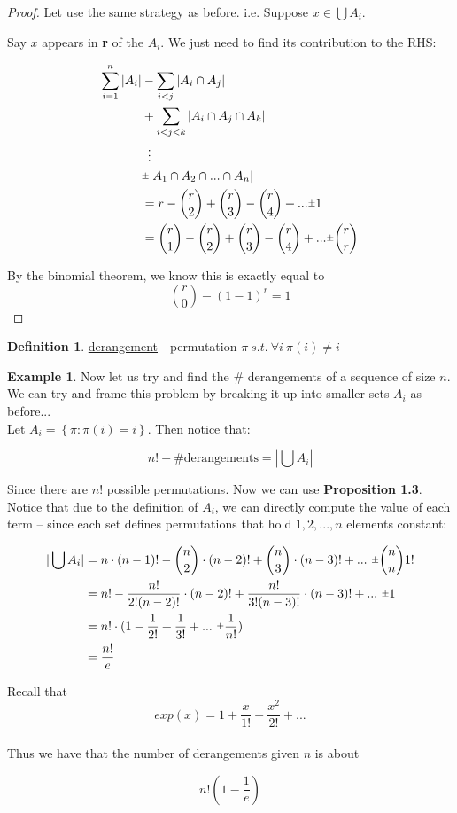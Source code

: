 \documentclass[psamsfonts, 12pt]{amsart}
\theoremstyle{definition}
\newtheorem{defn}[thm]{Definition}
\newtheorem{exmp}[thm]{Example}
\theoremstyle{remark}
\newcommand{\rpm}{\sbox0{$1$}\sbox2{$\scriptstyle\pm$}
  \raise\dimexpr(\ht0-\ht2)/2\relax\box2 }
\begin{document}
\begin{proof} Let use the same strategy as before. i.e. Suppose $x\in \bigcup A_i$.

Say $x$ appears in \textbf{r} of the $A_i$. We just need to find its contribution to the RHS:

\begin{align*}
\sum_{i=1}^n|A_i| &- \sum_{i<j}|A_i \cap A_j |\\
&+\sum_{i<j<k}|A_i \cap A_j \cap A_k |\\
&\ \vdots\\
&\rpm |A_1 \cap A_2 \cap ... \cap A_n | \\
&= r - {r\choose2} + {r\choose3} - {r\choose4} + ... \rpm 1\\
&= {r\choose1} - {r\choose2} + {r\choose3} - {r\choose4} + ... \rpm {r\choose r}
\end{align*}

By the binomial theorem, we know this is exactly equal to
\[
{r\choose0} - (1-1)^r = 1
\]

\end{proof}

\begin{defn}
\underline{derangement} - permutation $\pi\ s.t.\ \forall i\ \pi(i)\neq i$
\end{defn}

\begin{exmp}
Now let us try and find the \# derangements of a sequence of size $n$.
\\

We can try and frame this problem by breaking it up into smaller sets $A_i$ as before...
\\

Let $A_i = \left\lbrace \pi : \pi(i) = i \right\rbrace$. Then notice that:

\[
n! - \text{\# derangements} = |\bigcup A_i|
\]

Since there are $n!$ possible permutations. Now we can use \textbf{Proposition 1.3}. Notice that due to the definition of $A_i$, we can directly compute the value of each term -- since each set defines permutations that hold $1,2,...,n$ elements constant:

\begin{align*}
|\bigcup A_i| &= n \cdot (n-1)! - {n\choose2}\cdot(n-2)! + {n\choose3}\cdot(n-3)! + ...\ \rpm {n\choose n}1!\\
&= n! - \frac{n!}{2!(n-2)!}\cdot(n-2)! + \frac{n!}{3!(n-3)!}\cdot(n-3)! + ...\ \rpm 1\\
&= n! \cdot (1 - \frac{1}{2!} + \frac{1}{3!} + ...\ \rpm \frac{1}{n!} ) \\
&= \frac{n!}{e}
\end{align*}

Recall that
\[
exp(x) = 1 + \frac{x}{1!} + \frac{x^2}{2!} + ...
\]
\\

Thus we have that the number of derangements given $n$ is about

\[
n! (1 - \frac{1}{e})
\]
\end{exmp}
\end{document}
